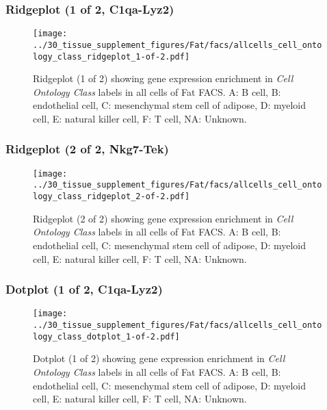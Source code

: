 \clearpage

\subsubsection{Ridgeplot (1 of 2, C1qa-Lyz2)}
\begin{figure}[h]
\centering
\texttt{[image: ../30\_tissue\_supplement\_figures/Fat/facs/allcells\_cell\_ontology\_class\_ridgeplot\_1-of-2.pdf]}

\caption{ Ridgeplot (1 of 2)  showing gene expression enrichment in \emph{Cell Ontology Class} labels in all cells of Fat FACS. A: B cell, B: endothelial cell, C: mesenchymal stem cell of adipose, D: myeloid cell, E: natural killer cell, F: T cell, NA: Unknown.}
\end{figure}


\clearpage

\subsubsection{Ridgeplot (2 of 2, Nkg7-Tek)}
\begin{figure}[h]
\centering
\texttt{[image: ../30\_tissue\_supplement\_figures/Fat/facs/allcells\_cell\_ontology\_class\_ridgeplot\_2-of-2.pdf]}

\caption{ Ridgeplot (2 of 2)  showing gene expression enrichment in \emph{Cell Ontology Class} labels in all cells of Fat FACS. A: B cell, B: endothelial cell, C: mesenchymal stem cell of adipose, D: myeloid cell, E: natural killer cell, F: T cell, NA: Unknown.}
\end{figure}


\clearpage

\subsubsection{Dotplot (1 of 2, C1qa-Lyz2)}
\begin{figure}[h]
\centering
\texttt{[image: ../30\_tissue\_supplement\_figures/Fat/facs/allcells\_cell\_ontology\_class\_dotplot\_1-of-2.pdf]}

\caption{ Dotplot (1 of 2)  showing gene expression enrichment in \emph{Cell Ontology Class} labels in all cells of Fat FACS. A: B cell, B: endothelial cell, C: mesenchymal stem cell of adipose, D: myeloid cell, E: natural killer cell, F: T cell, NA: Unknown.}
\end{figure}


\clearpage

